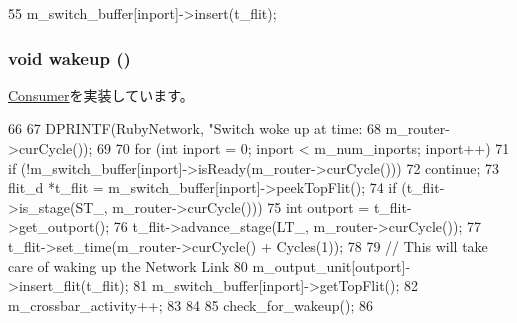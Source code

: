\begin{DoxyCode}
55     { m_switch_buffer[inport]->insert(t_flit); }
\end{DoxyCode}
\hypertarget{classSwitch__d_ae674290a26ecbd622c5160e38e8a4fe9}{
\subsubsection[{wakeup}]{\setlength{\rightskip}{0pt plus 5cm}void wakeup ()}}
\label{classSwitch__d_ae674290a26ecbd622c5160e38e8a4fe9}


\hyperlink{classConsumer_a623e3e7d1b1c725d70009f7b01a421b9}{Consumer}を実装しています。


\begin{DoxyCode}
66 {
67     DPRINTF(RubyNetwork, "Switch woke up at time: %
68             m_router->curCycle());
69 
70     for (int inport = 0; inport < m_num_inports; inport++) {
71         if (!m_switch_buffer[inport]->isReady(m_router->curCycle()))
72             continue;
73         flit_d *t_flit = m_switch_buffer[inport]->peekTopFlit();
74         if (t_flit->is_stage(ST_, m_router->curCycle())) {
75             int outport = t_flit->get_outport();
76             t_flit->advance_stage(LT_, m_router->curCycle());
77             t_flit->set_time(m_router->curCycle() + Cycles(1));
78 
79             // This will take care of waking up the Network Link
80             m_output_unit[outport]->insert_flit(t_flit);
81             m_switch_buffer[inport]->getTopFlit();
82             m_crossbar_activity++;
83         }
84     }
85     check_for_wakeup();
86 }
\end{DoxyCode}


